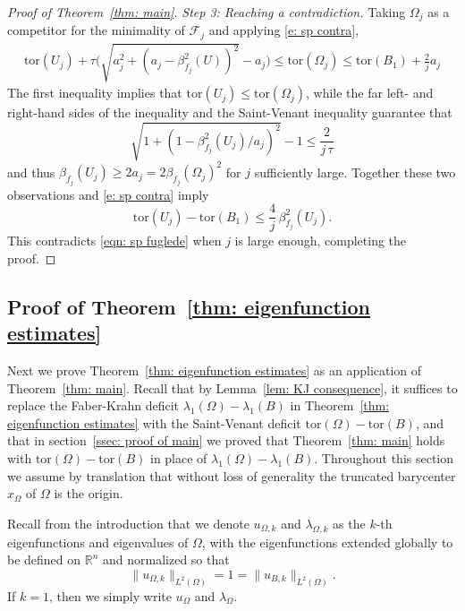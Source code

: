 \documentclass[10pt, reqno]{amsart}
\numberwithin{equation}{section}
\def\R{{\mathbb R}}
\def\W{\Omega}
\def\tor{\mathrm{tor}}
\begin{document}
\begin{proof}[Proof of Theorem~\ref{thm: main}]
 {\it Step 3: Reaching a contradiction.}   
Taking $\W_j$ as a competitor for the minimality of $\mathcal{F}_j$ and applying \eqref{e: sp contra}, 
\begin{align*}
	\tor(U_j)  + \tau  \Big( \sqrt{a_j^2 + (a_j -\beta^2_{f_j}(U))^2} -a_j\Big)  \leq \tor(\W_j) \leq  \tor(B_1) + \frac{2}{j} a_j
\end{align*} 
The first inequality implies that $\tor(U_j) \leq \tor(\W_j)$, while the far left- and right-hand sides of the inequality and the Saint-Venant inequality guarantee that 
\[
\sqrt{1 + (1 -\beta^2_{f_j}(U_j)/a_j)^2} -1  \leq \frac{2}{j \,\tau } 
\]  
and thus $\beta_{f_j}(U_j)\geq 2 a_j= 2\beta_{f_j}(\W_j)^2$ for $j$ sufficiently large. Together these two observations and \eqref{e: sp contra} imply
	\begin{equation}
		\tor(U_j ) - \tor(B_1) \leq \frac{4}{j}\, \beta_{f_j}^2(U_j). 
	\end{equation}
	This contradicts \eqref{eqn: sp fuglede} when $j$ is large enough, completing the proof.
\end{proof}
%
%
%

\subsection{Proof of Theorem~\ref{thm: eigenfunction estimates}} Next we prove Theorem~\ref{thm: eigenfunction estimates} as an application of Theorem~\ref{thm: main}. Recall that by Lemma~\ref{lem: KJ consequence}, it suffices to replace the Faber-Krahn deficit $\lambda_1(\W)-\lambda_1(B)$ in Theorem~\ref{thm: eigenfunction estimates} with the Saint-Venant deficit $\tor(\W) -\tor(B)$, and that in section~\ref{ssec: proof of main} we proved that Theorem~\ref{thm: main} holds with $\tor(\W) -\tor(B)$ in place of $\lambda_1(\W)-\lambda_1(B)$.
Throughout this section we assume by translation that without loss of generality the truncated barycenter $x_\W$ of $\W$ is the origin.

Recall from the introduction that we denote $u_{\W,k}$ and $\lambda_{\W,k}$ as the $k$-th eigenfunctions and eigenvalues of $\Omega$, with the eigenfunctions extended globally to be defined on $\R^n$ and  normalized so that 
\begin{equation} \label{e:one}
 \| u_{\W,k} \|_{L^2(\W)} = 1 =  \| u_{B,k} \|_{L^2(\W)}. 
\end{equation}
If $k=1$, then we simply write $u_{\W}$ and $\lambda_{\W}$. 
\end{document}
